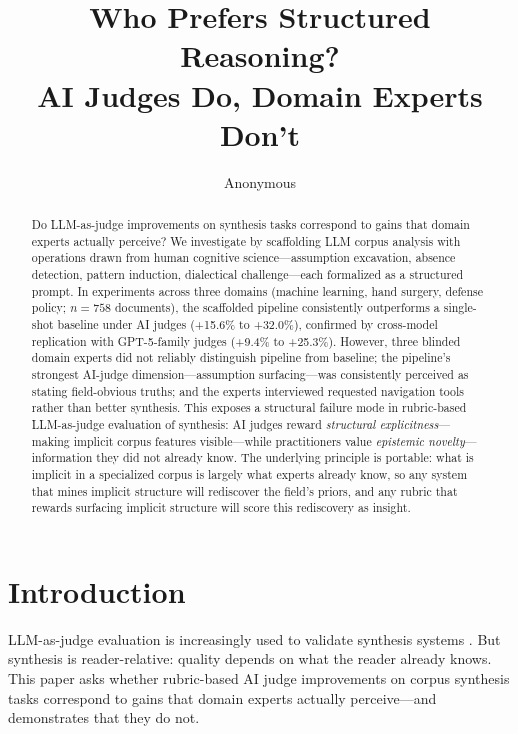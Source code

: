 \documentclass{article}
\title{Who Prefers Structured Reasoning? \\
AI Judges Do, Domain Experts Don't}
\author{Anonymous}
\begin{document}
\maketitle

\begin{abstract}
Do LLM-as-judge improvements on synthesis tasks correspond to gains that domain experts actually perceive? We investigate by scaffolding LLM corpus analysis with operations drawn from human cognitive science---assumption excavation, absence detection, pattern induction, dialectical challenge---each formalized as a structured prompt. In experiments across three domains (machine learning, hand surgery, defense policy; $n{=}758$ documents), the scaffolded pipeline consistently outperforms a single-shot baseline under AI judges (+15.6\% to +32.0\%), confirmed by cross-model replication with GPT-5-family judges (+9.4\% to +25.3\%). However, three blinded domain experts did not reliably distinguish pipeline from baseline; the pipeline's strongest AI-judge dimension---assumption surfacing---was consistently perceived as stating field-obvious truths; and the experts interviewed requested navigation tools rather than better synthesis. This exposes a structural failure mode in rubric-based LLM-as-judge evaluation of synthesis: AI judges reward \textit{structural explicitness}---making implicit corpus features visible---while practitioners value \textit{epistemic novelty}---information they did not already know. The underlying principle is portable: what is implicit in a specialized corpus is largely what experts already know, so any system that mines implicit structure will rediscover the field's priors, and any rubric that rewards surfacing implicit structure will score this rediscovery as insight.
\end{abstract}

\section{Introduction}
\label{sec:intro}

LLM-as-judge evaluation is increasingly used to validate synthesis systems \citep{zheng2023judging,shankar2024validates,bavaresco2024llms}. But synthesis is reader-relative: quality depends on what the reader already knows. This paper asks whether rubric-based AI judge improvements on corpus synthesis tasks correspond to gains that domain experts actually perceive---and demonstrates that they do not.
\end{document}
